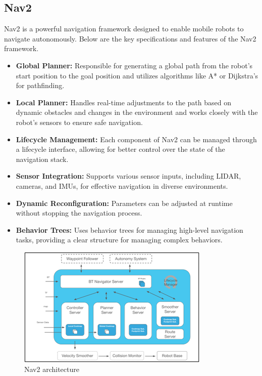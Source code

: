 \subsection{\fontsize{14}{16} Nav2}
{
	\fontsize{12}{14}
	Nav2 is a powerful navigation framework designed to enable mobile robots to navigate autonomously. Below are the key specifications and features of the Nav2 framework.
	\begin{itemize}
		\item \textbf{Global Planner:} Responsible for generating a global path from the robot's start position
		to the goal position and utilizes algorithms like A* or Dijkstra’s for pathfinding.
		\item \textbf{Local Planner:} Handles real-time adjustments to the path based on dynamic obstacles
		and changes in the environment and works closely with the robot's sensors to ensure
		safe navigation.
		\item \textbf{Lifecycle Management:} Each component of Nav2 can be managed through a lifecycle
		interface, allowing for better control over the state of the navigation stack.
		\item \textbf{Sensor Integration:} Supports various sensor inputs, including LIDAR, cameras, and
		IMUs, for effective navigation in diverse environments.
		\item \textbf{Dynamic Reconfiguration:} Parameters can be adjusted at runtime without stopping
		the navigation process.
		\item \textbf{Behavior Trees:} Uses behavior trees for managing high-level navigation tasks,
		providing a clear structure for managing complex behaviors.
	\end{itemize}
	
	\begin{figure}[H]
		\centering
		\includegraphics{images/Content/nav2arch}
		\caption{Nav2 architecture \cite{nav2_docs}}
		\label{fig:nav2arch}
	\end{figure}
}

